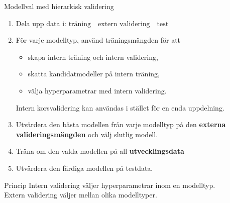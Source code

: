 \documentclass[10pt,english]{beamer}
\begin{document}
\begin{frame}{Modellval med hierarkisk validering}

\begin{enumerate}
        \item Dela upp data i: $\text{träning} \quad \text{extern validering} \quad \text{test}$
    \item För varje modelltyp, använd träningsmängden för att
    \begin{itemize}
        \item skapa intern träning och intern validering,
        \item skatta kandidatmodeller på intern träning,
        \item välja hyperparametrar med intern validering.
    \end{itemize}
    Intern korsvalidering kan användas i stället för en enda uppdelning.

    \item Utvärdera den bästa modellen från varje modelltyp på den
    \textbf{externa valideringsmängden} och välj slutlig modell.

    \item Träna om den valda modellen på all \textbf{utvecklingsdata}

    \item Utvärdera den färdiga modellen på testdata.
\end{enumerate}

\begin{block}{Princip}
Intern validering väljer hyperparametrar inom en modelltyp.\\
Extern validering väljer mellan olika modelltyper.
\end{block}

\end{frame}
\end{document}
